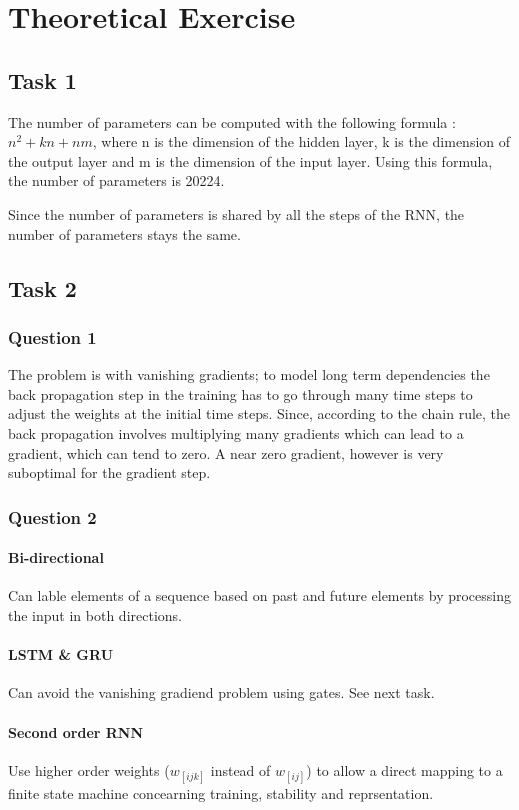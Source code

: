 \documentclass[10pt]{article}
\begin{document}
\section{Theoretical Exercise}
\subsection{Task 1}
The number of parameters can be computed with the following formula : 
$n^2+kn+nm$, where n is the dimension of the hidden layer, k is the dimension of the output layer and m is the dimension of the input layer. Using this formula, the number of parameters is 20224. 

Since the number of parameters is shared by all the steps of the RNN, the number of parameters stays the same.

\subsection{Task 2}
\subsubsection{Question 1}
The problem is with vanishing gradients; to model long term dependencies the back propagation step in the training has to go through many time steps to adjust the weights at the initial time steps. Since, according to the chain rule, the back propagation involves multiplying many gradients which can lead to a gradient, which can tend to zero. A near zero gradient, however is very suboptimal for the gradient step. 
\subsubsection{Question 2}
\paragraph{Bi-directional} Can lable elements of a sequence based on past and future elements by processing the input in both directions.

\paragraph{LSTM \& GRU} Can avoid the vanishing gradiend problem using gates. See next task.

\paragraph{Second order RNN} Use higher order weights ($w_[ijk]$ instead of $w_[ij]$) to allow a direct mapping to a finite state machine concearning training, stability and reprsentation.
\end{document}
